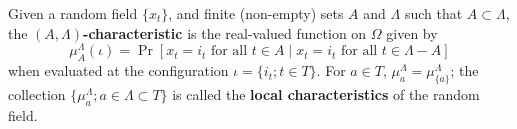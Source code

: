 Given a random field $\{x_t\}$, and finite (non-empty) sets $A$ and $\Lambda$ such that $A \subset \Lambda$, the \textbf{$(A, \Lambda)$-characteristic} is the real-valued function on $\Omega$ given by
$$\mu_A^\Lambda(\iota) = \Pr[x_t = i_t \text{ for all } t \in A \mid x_t = i_t \text{ for all } t \in \Lambda - A]$$
when evaluated at the configuration $\iota = \{i_t; t \in T\}$. For $a \in T$, $\mu_a^\Lambda = \mu_{\{a\}}^\Lambda$; the collection $\{\mu_a^\Lambda; a \in \Lambda \subset T\}$ is called the \textbf{local characteristics} of the random field.
